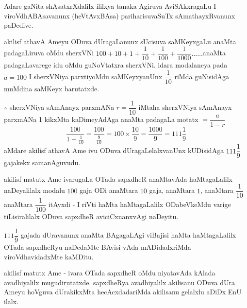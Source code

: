 Adare gaNita shAsatxrXdalilx ililxya tanaka Agiruva AviSAkxragaLu I viroVdhABAsavanunx (heVtAvxBAsa) pariharisuvaSuTx sAmathayxRvanunx paDedive.

akilisf athavA Ameyu ODuva dUragaLanunx sUcisuva saMKeyxgaLu anaMta padagaLiruva oMdu sherxVNi $100+10+1+\dfrac{1}{10}+\dfrac{1}{100}+\dfrac{1}{1000}\ldots\ldots$anaMta padagaLavarege idu oMdu guNoVtatxra sherxVNi. idara modalaneya pada $a=100$ I sherxVNiya parxtiyoMdu saMKeyxyanUnx $\dfrac{1}{10}$ riMda guNisidAga muMdina saMKeyx barutatxde.

$\therefore$ sherxVNiya sAmAnayx parxmANa $r=\dfrac{1}{10}$ iMtaha sherxVNiya sAmAnayx parxmANa {\rm 1} kikxMta kaDimeyAdAga anaMta padagaLa motatx $=\dfrac{a}{1-r}$
$$
\frac{100}{1-\frac{1}{10}}=\frac{100}{\frac{9}{10}}=100\times \frac{10}{9}=\frac{1000}{9}=111\frac{1}{9}
$$
aMdare akilisf athavA Ame ivu ODuva dUragaLelalxvanUnx kUDisidAga $111\dfrac{1}{9}$ gajakekx samanAguvudu.

akilisf matutx Ame ivarugaLa OTada sapxdheR anaMtavAda haMtagaLalilx naDeyalilalx modalu $100$ gaja ODi anaMtara $10$ gaja, anaMtara $1$, anaMtara $\dfrac{1}{10}$ anaMtara $\dfrac{1}{100}$ itAyxdi - I riVti haMta haMtagaLalilx ODabeVkeMdu varige tiLisiralilalx ODuva sapxdheR aviciCxnanxvAgi naDeyitu.

$111\dfrac{1}{9}$ gajada dUravanunx anaMta BAgagaLAgi viBajisi haMta haMtagaLalilx OTada sapxdheRyu naDedaMte BAvisi vAda mADidadxriMda viroVdhavidadxMte kaMDitu. 

akilisf matutx Ame - ivara OTada sapxdheR oMdu niyatavAda kAlada avadhiyalilx mugudirutatxde. sapxdheRya avadhiyalilx akilisanu ODuva dUra Ameyu hoVguva dUrakikxMta hecAcxdadariMda akilisanu gelalxlu aDiDx EnU ilalx.
